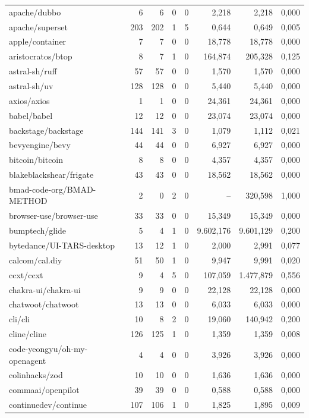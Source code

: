 \begin{tabular}{lrrrrrrr}
apache/dubbo & 6 & 6 & 0 & 0 & 2,218 & 2,218 & 0,000 \\
apache/superset & 203 & 202 & 1 & 5 & 0,644 & 0,649 & 0,005 \\
apple/container & 7 & 7 & 0 & 0 & 18,778 & 18,778 & 0,000 \\
aristocratos/btop & 8 & 7 & 1 & 0 & 164,874 & 205,328 & 0,125 \\
astral-sh/ruff & 57 & 57 & 0 & 0 & 1,570 & 1,570 & 0,000 \\
astral-sh/uv & 128 & 128 & 0 & 0 & 5,440 & 5,440 & 0,000 \\
axios/axios & 1 & 1 & 0 & 0 & 24,361 & 24,361 & 0,000 \\
babel/babel & 12 & 12 & 0 & 0 & 23,074 & 23,074 & 0,000 \\
backstage/backstage & 144 & 141 & 3 & 0 & 1,079 & 1,112 & 0,021 \\
bevyengine/bevy & 44 & 44 & 0 & 0 & 6,927 & 6,927 & 0,000 \\
bitcoin/bitcoin & 8 & 8 & 0 & 0 & 4,357 & 4,357 & 0,000 \\
blakeblackshear/frigate & 43 & 43 & 0 & 0 & 18,562 & 18,562 & 0,000 \\
bmad-code-org/BMAD-METHOD & 2 & 0 & 2 & 0 & -- & 320,598 & 1,000 \\
browser-use/browser-use & 33 & 33 & 0 & 0 & 15,349 & 15,349 & 0,000 \\
bumptech/glide & 5 & 4 & 1 & 0 & 9.602,176 & 9.601,129 & 0,200 \\
bytedance/UI-TARS-desktop & 13 & 12 & 1 & 0 & 2,000 & 2,991 & 0,077 \\
calcom/cal.diy & 51 & 50 & 1 & 0 & 9,947 & 9,991 & 0,020 \\
ccxt/ccxt & 9 & 4 & 5 & 0 & 107,059 & 1.477,879 & 0,556 \\
chakra-ui/chakra-ui & 9 & 9 & 0 & 0 & 22,128 & 22,128 & 0,000 \\
chatwoot/chatwoot & 13 & 13 & 0 & 0 & 6,033 & 6,033 & 0,000 \\
cli/cli & 10 & 8 & 2 & 0 & 19,060 & 140,942 & 0,200 \\
cline/cline & 126 & 125 & 1 & 0 & 1,359 & 1,359 & 0,008 \\
code-yeongyu/oh-my-openagent & 4 & 4 & 0 & 0 & 3,926 & 3,926 & 0,000 \\
colinhacks/zod & 10 & 10 & 0 & 0 & 1,636 & 1,636 & 0,000 \\
commaai/openpilot & 39 & 39 & 0 & 0 & 0,588 & 0,588 & 0,000 \\
continuedev/continue & 107 & 106 & 1 & 0 & 1,825 & 1,895 & 0,009 \\

\end{tabular}
